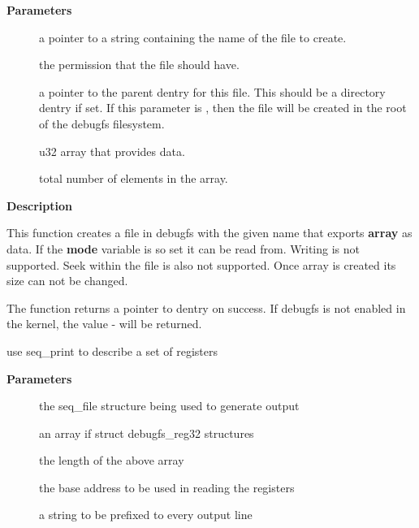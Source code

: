 \documentclass[a4paper,8pt,english]{sphinxmanual}
\begin{document}
\textbf{Parameters}
\begin{description}
\item[{}] \leavevmode
a pointer to a string containing the name of the file to create.

\item[{}] \leavevmode
the permission that the file should have.

\item[{}] \leavevmode
a pointer to the parent dentry for this file.  This should be a
directory dentry if set.  If this parameter is , then the
file will be created in the root of the debugfs filesystem.

\item[{}] \leavevmode
u32 array that provides data.

\item[{}] \leavevmode
total number of elements in the array.

\end{description}

\textbf{Description}

This function creates a file in debugfs with the given name that exports
\textbf{array} as data. If the \textbf{mode} variable is so set it can be read from.
Writing is not supported. Seek within the file is also not supported.
Once array is created its size can not be changed.

The function returns a pointer to dentry on success. If debugfs is not
enabled in the kernel, the value - will be returned.

\begin{fulllineitems}
\label{filesystems/index:c.debugfs_print_regs32}
use seq\_print to describe a set of registers

\end{fulllineitems}


\textbf{Parameters}
\begin{description}
\item[{}] \leavevmode
the seq\_file structure being used to generate output

\item[{}] \leavevmode
an array if struct debugfs\_reg32 structures

\item[{}] \leavevmode
the length of the above array

\item[{}] \leavevmode
the base address to be used in reading the registers

\item[{}] \leavevmode
a string to be prefixed to every output line

\end{description}
\end{document}
